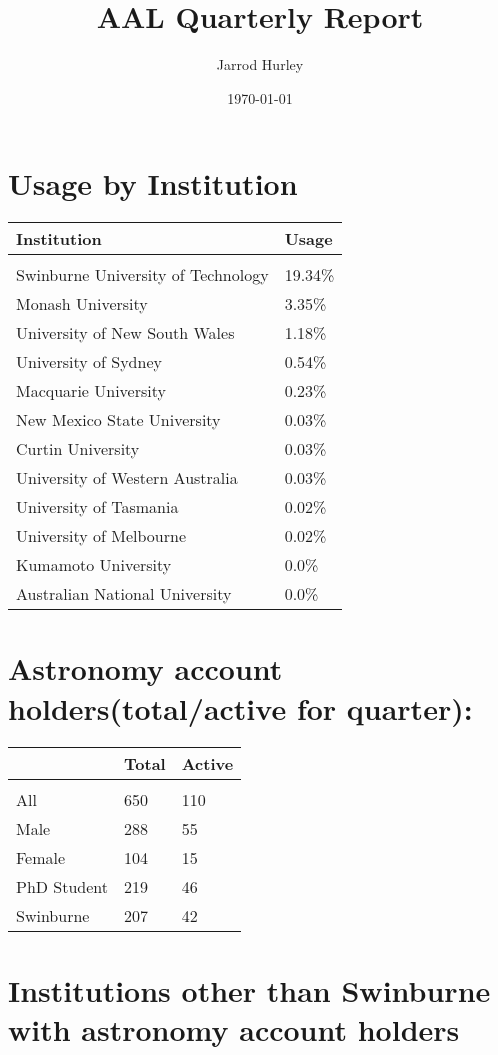 \documentclass{article}%
\title{AAL Quarterly Report}%
\author{Jarrod Hurley}%
\date{\today}%
\begin{document}
%
\normalsize%
\maketitle%
\newpage%
\section{Usage by Institution }%

%
\begin{longtabu}{X[l] X[r]}%
\textbf{Institution}&\textbf{Usage}\\%
\hline%
&\\%
Swinburne University of Technology&19.34\%\\%
\hline%
Monash University&3.35\%\\%
\hline%
University of New South Wales&1.18\%\\%
\hline%
University of Sydney&0.54\%\\%
\hline%
Macquarie University&0.23\%\\%
\hline%
New Mexico State University&0.03\%\\%
\hline%
Curtin University&0.03\%\\%
\hline%
University of Western Australia&0.03\%\\%
\hline%
University of Tasmania&0.02\%\\%
\hline%
University of Melbourne&0.02\%\\%
\hline%
Kumamoto University&0.0\%\\%
\hline%
Australian National University&0.0\%\\%
\hline%
\end{longtabu}%
\section{Astronomy account holders(total/active for quarter): }%

%
\begin{longtabu}{X[l] X[r] X[r]}%
\textbf{}&\textbf{Total}&\textbf{Active}\\%
\hline%
&&\\%
All&650&110\\%
\hline%
Male&288&55\\%
\hline%
Female&104&15\\%
\hline%
PhD Student&219&46\\%
\hline%
Swinburne&207&42\\%
\hline%
\end{longtabu}%
\section{Institutions other than Swinburne with astronomy account holders}%
\end{document}
